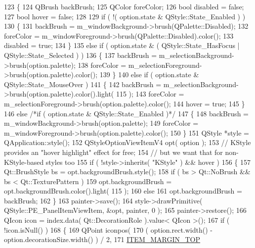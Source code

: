 \begin{DoxyCode}
123 \{
124     QBrush backBrush;
125     QColor foreColor;
126     \textcolor{keywordtype}{bool} disabled = \textcolor{keyword}{false};
127     \textcolor{keywordtype}{bool} hover = \textcolor{keyword}{false};
128 
129     \textcolor{keywordflow}{if} ( !( option.state & QStyle::State\_Enabled ) )
130     \{
131         backBrush = m\_windowBackground->brush(QPalette::Disabled);
132         foreColor = m\_windowForeground->brush(QPalette::Disabled).color();
133         disabled = \textcolor{keyword}{true};
134     \}
135     \textcolor{keywordflow}{else} \textcolor{keywordflow}{if} ( option.state & ( QStyle::State\_HasFocus | QStyle::State\_Selected ) )
136     \{
137         backBrush = m\_selectionBackground->brush(option.palette);
138         foreColor = m\_selectionForeground->brush(option.palette).color();
139     \}
140     \textcolor{keywordflow}{else} \textcolor{keywordflow}{if} ( option.state & QStyle::State\_MouseOver )
141     \{
142         backBrush = m\_selectionBackground->brush(option.palette).color().light( 115 );
143         foreColor = m\_selectionForeground->brush(option.palette).color();
144         hover = \textcolor{keyword}{true};
145     \}
146     \textcolor{keywordflow}{else} \textcolor{comment}{/*if ( option.state & QStyle::State\_Enabled )*/}
147     \{
148         backBrush = m\_windowBackground->brush(option.palette);
149         foreColor = m\_windowForeground->brush(option.palette).color();
150     \}
151     QStyle *style = QApplication::style();
152     QStyleOptionViewItemV4 opt( option );
153     \textcolor{comment}{// KStyle provides an "hover highlight" effect for free;}
154     \textcolor{comment}{// but we want that for non-KStyle-based styles too}
155     \textcolor{keywordflow}{if} ( !style->inherits( \textcolor{stringliteral}{"KStyle"} ) && hover )
156     \{
157         Qt::BrushStyle bs = opt.backgroundBrush.style();
158         \textcolor{keywordflow}{if} ( bs > Qt::NoBrush && bs < Qt::TexturePattern )
159             opt.backgroundBrush = opt.backgroundBrush.color().light( 115 );
160         \textcolor{keywordflow}{else}
161             opt.backgroundBrush = backBrush;
162     \}
163     painter->save();
164     style->drawPrimitive( QStyle::PE\_PanelItemViewItem, &opt, painter, 0 );
165     painter->restore();
166     QIcon icon = index.data( Qt::DecorationRole ).value< QIcon >();
167     \textcolor{keywordflow}{if} ( !icon.isNull() )
168     \{
169         QPoint iconpos(
170             ( option.rect.width() - option.decorationSize.width() ) / 2,
171             \hyperlink{sidebar_8cpp_ac3448bc25211fcbb3cbb988706407be7}{ITEM\_MARGIN\_TOP}

\end{DoxyCode}
